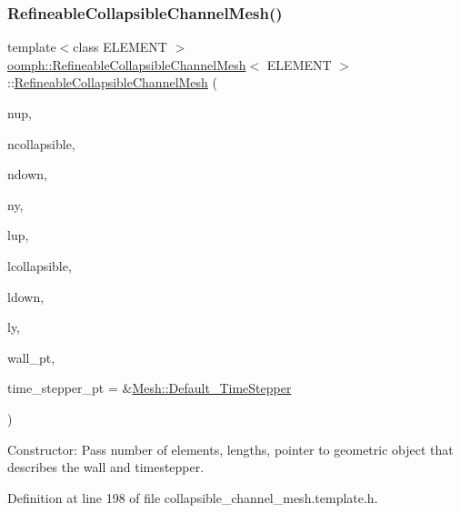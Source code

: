 \subsubsection{\texorpdfstring{Refineable\+Collapsible\+Channel\+Mesh()}{RefineableCollapsibleChannelMesh()}}
{\footnotesize\ttfamily template$<$class E\+L\+E\+M\+E\+NT $>$ \\
\hyperlink{classoomph_1_1RefineableCollapsibleChannelMesh}{oomph\+::\+Refineable\+Collapsible\+Channel\+Mesh}$<$ E\+L\+E\+M\+E\+NT $>$\+::\hyperlink{classoomph_1_1RefineableCollapsibleChannelMesh}{Refineable\+Collapsible\+Channel\+Mesh} (\begin{DoxyParamCaption}\item[{const unsigned \&}]{nup,  }\item[{const unsigned \&}]{ncollapsible,  }\item[{const unsigned \&}]{ndown,  }\item[{const unsigned \&}]{ny,  }\item[{const double \&}]{lup,  }\item[{const double \&}]{lcollapsible,  }\item[{const double \&}]{ldown,  }\item[{const double \&}]{ly,  }\item[{\hyperlink{classoomph_1_1GeomObject}{Geom\+Object} $\ast$}]{wall\+\_\+pt,  }\item[{\hyperlink{classoomph_1_1TimeStepper}{Time\+Stepper} $\ast$}]{time\+\_\+stepper\+\_\+pt = {\ttfamily \&\hyperlink{classoomph_1_1Mesh_a12243d0fee2b1fcee729ee5a4777ea10}{Mesh\+::\+Default\+\_\+\+Time\+Stepper}} }\end{DoxyParamCaption})\hspace{0.3cm}{\ttfamily [inline]}}



Constructor\+: Pass number of elements, lengths, pointer to geometric object that describes the wall and timestepper. 



Definition at line 198 of file collapsible\+\_\+channel\+\_\+mesh.\+template.\+h.

\mbox{\label{classoomph_1_1RefineableCollapsibleChannelMesh_ae429201cc0fe53f5abf96b7d9564df65}} 
